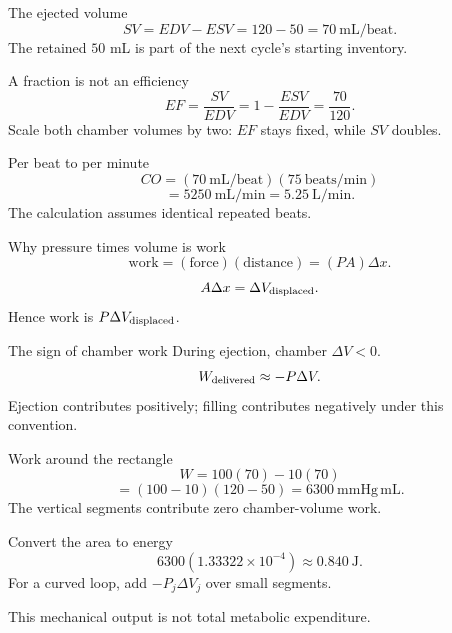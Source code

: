 \documentclass[aspectratio=169,11pt]{beamer}
\newcommand{\notestarget}{notes.pdf}\newcommand{\noteslabel}{Notes}
\begin{document}
\renewcommand{\notestarget}{notes.pdf\#note-stroke-volume-ejection-fraction-and-output}
\begin{frame}[t,fragile,label=slide-the-ejected-volume]{The ejected volume}
\[SV=EDV-ESV=120-50=70\ \mathrm{mL/beat}.\]\pause{} The retained $50$ mL is part of the next cycle's starting inventory.
\end{frame}
\renewcommand{\notestarget}{notes.pdf\#note-stroke-volume-ejection-fraction-and-output}
\begin{frame}[t,fragile,label=slide-a-fraction-is-not-an-efficiency]{A fraction is not an efficiency}
\[EF=\frac{SV}{EDV}=1-\frac{ESV}{EDV}=\frac{70}{120}.\]\pause{} Scale both chamber volumes by two: $EF$ stays fixed, while $SV$ doubles.
\end{frame}
\renewcommand{\notestarget}{notes.pdf\#note-stroke-volume-ejection-fraction-and-output}
\begin{frame}[t,fragile,label=slide-per-beat-to-per-minute]{Per beat to per minute}
\[CO=(70\ \mathrm{mL/beat})(75\ \mathrm{beats/min})\]\pause{}\[=5250\ \mathrm{mL/min}=5.25\ \mathrm{L/min}.\]\pause{} The calculation assumes identical repeated beats.
\end{frame}
\renewcommand{\notestarget}{notes.pdf\#note-derive-work-from-displaced-volume}
\begin{frame}[t,fragile,label=slide-why-pressure-times-volume-is-work]{Why pressure times volume is work}
\[\text{work}=(\text{force})(\text{distance})=(PA)\Delta x.\]\pause{}\[A\Delta x=\Delta V_{\rm displaced}.\]\pause{} Hence work is $P\Delta V_{\rm displaced}$.
\end{frame}
\renewcommand{\notestarget}{notes.pdf\#note-derive-work-from-displaced-volume}
\begin{frame}[t,fragile,label=slide-the-sign-of-chamber-work]{The sign of chamber work}
During ejection, chamber $\Delta V<0$.\pause{}\[W_{\rm delivered}\approx-P\Delta V.\]\pause{} Ejection contributes positively; filling contributes negatively under this convention.
\end{frame}
\renewcommand{\notestarget}{notes.pdf\#note-derive-work-from-displaced-volume}
\begin{frame}[t,fragile,label=slide-work-around-the-rectangle]{Work around the rectangle}
\[W=100(70)-10(70)\]\pause{}\[=(100-10)(120-50)=6300\ \mathrm{mmHg\,mL}.\]\pause{} The vertical segments contribute zero chamber-volume work.
\end{frame}
\renewcommand{\notestarget}{notes.pdf\#note-derive-work-from-displaced-volume}
\begin{frame}[t,fragile,label=slide-convert-the-area-to-energy]{Convert the area to energy}
\[6300(1.33322\times10^{-4})\approx0.840\ \mathrm J.\]\pause{} For a curved loop, add $-P_j\Delta V_j$ over small segments.\pause{}\par This mechanical output is not total metabolic expenditure.
\end{frame}
\end{document}
